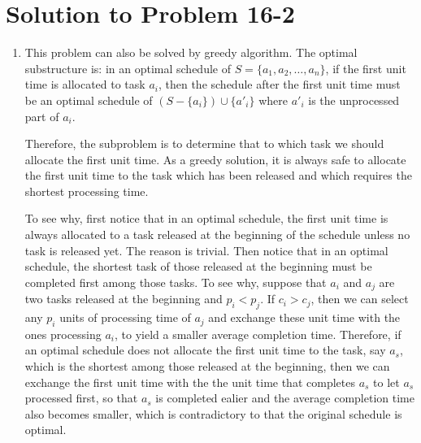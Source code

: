 \documentclass[fleqn]{article}
\begin{document}
\section*{Solution to Problem 16-2}

\begin{enumerate}
\renewcommand{\labelenumi}{\itshape \bfseries \alph{enumi}.}

\item  %

This problem can also be solved by greedy algorithm. The optimal
substructure is: in an optimal schedule of $S = \{a_1, a_2, \ldots,
a_n\}$, if the first unit time is allocated to task $a_i$, then the
schedule after the first unit time must be an optimal schedule of $(S
- \{a_i\}) \cup \{a'_i\}$ where $a'_i$ is the unprocessed part of
$a_i$.

Therefore, the subproblem is to determine that to which task we should
allocate the first unit time. As a greedy solution, it is always safe
to allocate the first unit time to the task which has been released
and which requires the shortest processing time.

To see why, first notice that in an optimal schedule, the first unit
time is always allocated to a task released at the beginning of the
schedule unless no task is released yet. The reason is trivial. Then
notice that in an optimal schedule, the shortest task of those
released at the beginning must be completed first among those tasks.
To see why, suppose that $a_i$ and $a_j$ are two tasks released at the
beginning and $p_i < p_j$. If $c_i > c_j$, then we can select any
$p_i$ units of processing time of $a_j$ and exchange these unit time
with the ones processing $a_i$, to yield a smaller average completion
time. Therefore, if an optimal schedule does not allocate the first
unit time to the task, say $a_s$, which is the shortest among those
released at the beginning, then we can exchange the first unit time
with the the unit time that completes $a_s$ to let $a_s$ processed
first, so that $a_s$ is completed ealier and the average completion
time also becomes smaller, which is contradictory to that the original
schedule is optimal.


\end{enumerate}
\end{document}

